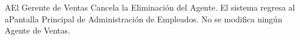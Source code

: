 		\begin{UCtrayectoriaA}{A}{El Gerente de Ventas Cancela la Eliminación del Agente.}
			\UCpaso El sistema regresa al aPantalla Principal de Administración de Empleados. No se modifica ningún Agente de Ventas. 
		\end{UCtrayectoriaA}
	
		
